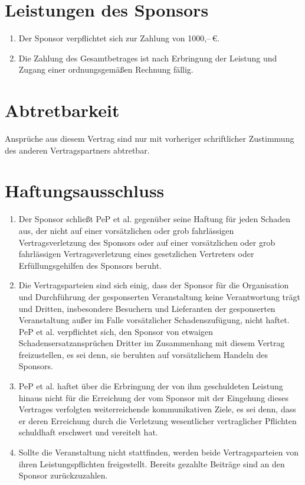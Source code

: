 \documentclass[
  paper=a4,
  fontsize=12pt,
  DIV=16,
  parskip=full,
  headinclude=true,
]{scrartcl}
\newcommand\sponsorbetrag{1000,–\,€}    %
\begin{document}
\section{Leistungen des Sponsors}

\begin{enumerate}[\qquad(1)]
  \item Der Sponsor verpflichtet sich zur Zahlung von \sponsorbetrag.
  \item Die Zahlung des Gesamtbetrages ist nach Erbringung der Leistung und
        Zugang einer ordnungsgemäßen Rechnung fällig.
\end{enumerate}

\section{Abtretbarkeit}

Ansprüche aus diesem Vertrag sind nur mit vorheriger schriftlicher Zustimmung des anderen Vertragspartners abtretbar.

\section{Haftungsausschluss}

\begin{enumerate}[\qquad(1)]
  \item Der Sponsor schließt PeP et al. gegenüber seine Haftung für jeden
        Schaden aus, der nicht auf einer vorsätzlichen oder grob fahrlässigen
        Vertragsverletzung des Sponsors oder auf einer vorsätzlichen oder grob
        fahrlässigen Vertragsverletzung eines gesetzlichen Vertreters oder
        Erfüllungsgehilfen des Sponsors beruht.
  \item Die Vertragsparteien sind sich einig, dass der Sponsor für die
        Organisation und Durchführung der gesponserten Veranstaltung keine
        Verantwortung trägt und Dritten, insbesondere Besuchern und Lieferanten
        der gesponserten Veranstaltung außer im Falle vorsätzlicher
        Schadenszufügung, nicht haftet.
        PeP et al. verpflichtet sich, den Sponsor von etwaigen
        Schadensersatzansprüchen Dritter im Zusammenhang mit diesem Vertrag
        freizustellen, es sei denn, sie beruhten auf vorsätzlichem Handeln des
        Sponsors.
  \item PeP et al. haftet über die Erbringung der von ihm geschuldeten
        Leistung hinaus nicht für die Erreichung der vom Sponsor mit der
        Eingehung dieses Vertrages verfolgten weiterreichende kommunikativen
        Ziele, es sei denn, dass er deren Erreichung durch die Verletzung
        wesentlicher vertraglicher Pflichten schuldhaft erschwert und vereitelt
        hat.
  \item Sollte die Veranstaltung nicht stattfinden, werden beide
        Vertragsparteien von ihren Leistungspflichten freigestellt. Bereits
        gezahlte Beiträge sind an den Sponsor zurückzuzahlen.
\end{enumerate}
\end{document}
